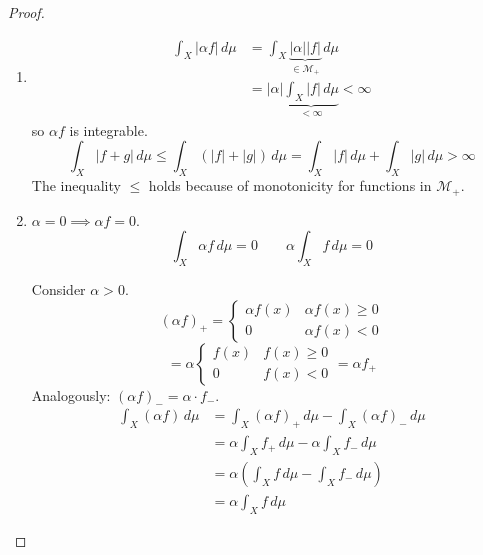 \documentclass{article}
\newcommand{\card}[1]{\left|#1\right|}
\begin{document}
\begin{proof}
  \begin{enumerate}
    \item
      \begin{align*}
        \int_X \card{\alpha f} \, d\mu &= \int_X \underbrace{\card{\alpha} \card{f}}_{\in \mathcal M_+} \, d\mu \\
          &= \card{\alpha} \underbrace{\int_X \card{f} \, d\mu}_{< \infty} < \infty
      \end{align*}
      so $\alpha f$ is integrable.
      \[ \int_X \card{f+g} \, d\mu \leq \int_X\left(\card{f} + \card{g}\right) \, d\mu = \int_X \card{f} \, d\mu + \int_X \card{g} \, d\mu > \infty \]
      The inequality $\leq$ holds because of monotonicity for functions in $\mathcal M_+$.

    \item $\alpha = 0 \implies \alpha f = 0$.
      \[ \int_X \alpha f \, d\mu = 0 \qquad \alpha \int_X f \, d\mu = 0 \]
      
      Consider $\alpha > 0$.
      \[
        (\alpha f)_+ = \begin{cases}
          \alpha f(x) & \alpha f(x) \geq 0 \\
          0 & \alpha f(x) < 0
        \end{cases}
      \] \[
        = \alpha \begin{cases}
          f(x) & f(x) \geq 0 \\
          0 & f(x) < 0
        \end{cases} = \alpha f_+
      \]
      Analogously: $(\alpha f)_- = \alpha \cdot f_-$.
      \begin{align*}
        \int_X (\alpha f) \, d\mu &= \int_X (\alpha f)_+ \, d\mu - \int_X (\alpha f)_- \, d\mu \\
          &= \alpha \int_X f_+ \, d\mu - \alpha \int_X f_- \, d\mu \\
          &= \alpha \left(\int_X f \, d\mu - \int_X f_- \, d\mu\right) \\
          &= \alpha \int_X f \, d\mu
      \end{align*}


\end{enumerate}
\end{proof}
\end{document}
